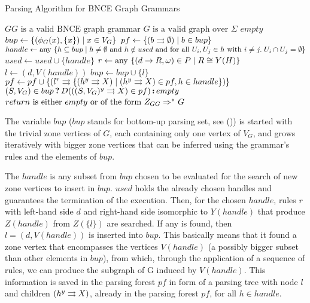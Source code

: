 \documentclass[]{report}
\begin{document}
\begin{algorithm}[!h]
	\caption{Parsing Algorithm for BNCE Graph Grammars}
	\begin{algorithmic}[!ht]
		\Require $GG \text{ is a valid BNCE graph grammar}$
		\Require $G \text{ is a valid graph over } \Sigma$
				\State \Return $empty$ 
			\EndIf
			\State $bup \gets \{(\phi_G(x),\{x\}) \; | \; x \in V_G\}$ 
			\State $pf \gets \{ \ptree{b}{}{\emptyset} \st b \in bup \}$
			\Repeat
				\State $handle \gets \text{any } \{h \subseteq bup \; | \; h \neq \emptyset \text{ and } h \notin used \text{ and for all } U_i, U_j \in h \text{ with } i \neq j . \; U_i \cap U_j = \emptyset \}$
					\State \Break {}
				\EndIf
				\State $used \gets used \cup \{handle\}$ 
				 
					\State $r \gets \text{any } \{(d \to R,\omega) \in P \; | \; R \cong Y(H) \}$
					\State $l \gets (d,V(handle))$
						\State $bup \gets bup \cup \{l\}$ 
						\State $pf \gets pf \cup \{ \ptree{l}{r}{\{\ptree{h}{y}{X} \st \ptree{h}{y}{X} \in pf, h \in handle \}} \}$
					\EndIf
				\EndFor
			 
			\State \Return $(S, V_G) \in bup \? D(\ptree{(S,V_G)}{y}{X} \in pf) \: empty $
		\EndFunction
		\Ensure $return \text{ is either } empty \text{ or of the form } \startG{GG} \derivtr{}{}{} G$
	\end{algorithmic}
	\label{alg:parse}
\end{algorithm}

The variable $bup$ ($bup$ stands for bottom-up parsing set, see ())%
is started with the trivial zone vertices of $G$, each containing only one vertex of $V_G$, and grows iteratively with bigger zone vertices that can be inferred using the grammar's rules and the elements of $bup$.

The $handle$ is any subset from $bup$ chosen to be evaluated for the search of new zone vertices to insert in $bup$. $used$ holds the already chosen handles and guarantees the termination of the execution. Then, for the chosen $handle$, rules $r$ with left-hand side $d$ and right-hand side isomorphic to $Y(handle)$ that produce $Z(handle)$ from $Z(\{l\})$ are searched. If any is found, then $l = (d,V(handle))$ is inserted into $bup$. This basically means that it found a zone vertex that encompasses the vertices $V(handle)$ (a possibly bigger subset than other elements in $bup$), from which, through the application of a sequence of rules, we can produce the subgraph of G induced by $V(handle)$. This information is saved in the parsing forest $pf$ in form of a parsing tree with node $l$ and children $\ptree{h}{y}{X}$, already in the parsing forest $pf$, for all $h \in handle$.
\end{document}
